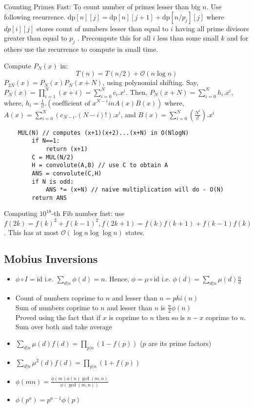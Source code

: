 Counting Primes Fast:  To count number of primes lesser than big $n$. Use following recurrence.
$\text{dp}[n][j] =\text{dp}[n][j + 1] + \text{dp}[n/p_j][j]$ where $dp[i][j]$ stores count of numbers lesser than equal to $i$
having all prime divisors greater than equal to $p_j$ . Precompute this for all $i$ less than some small $k$
and for others use the recurrence to compute in small time.

Compute $P_N(x)$ in:
\begin{equation}
  T(n)=T(n/2)+\mathcal{O}(n\log n)
\end{equation}
$P_{2N}(x) = P_{N}(x)P_{N}(x+N)$, using polynomial shifting.
Say, $P_N(x) = \prod \limits_{i=1}^N (x+i) = \sum_{i=0}^N c_i.x^i$.
Then, $P_N(x+N) = \sum_{i=0}^N h_i.x^i$, where, $h_i = \frac{1}{i!} . (\text{coefficient of } x^{N-i} in A(x)B(x))$ where, $A(x) = \sum \limits_{i=0}^{N} (c_{N-i}.(N-i)!) . x^i$, and $B(x) = \sum \limits_{i=0}^{N} \left( \frac {N^i}{i!} \right) . x^i$

\begin{verbatim}
    MUL(N) // computes (x+1)(x+2)...(x+N) in O(NlogN)
        if N==1:
            return (x+1)
        C = MUL(N/2)
        H = convolute(A,B) // use C to obtain A
        ANS = convolute(C,H)
        if N is odd:
            ANS *= (x+N) // naive multiplication will do - O(N)
        return ANS
\end{verbatim}

Computing $10^{18}$-th Fib number fast: use $f(2k) = f(k)^2 + f(k - 1)^2, f(2k + 1) = f(k)f(k + 1) + f(k - 1)f(k)$. This has at most $\mathcal{O}(\log n\log\log n)$ states.


\subsection{Mobius Inversions}

\begin{itemize}
  \item $\phi \circ I = \text{id}$ i.e. $\sum_{d|n} \phi(d)=n$. Hence, $\phi = \mu \circ \text{id}$ i.e. $\phi(d)=\sum_{d|n} \mu(d) \frac{n}{d}$
  \item Count of numbers coprime to $n$ and lesser than $n = phi(n)$ \\
        Sum of numbers coprime to $n$ and lesser than $n$  is $\frac{n}{2}\phi(n)$ \\
        Proved using the fact that if $x$ is coprime to $n$ then so is $n-x$ coprime to $n$. Sum over both and take average
  \item $\sum_{d|n} \mu(d)f(d)=\prod_{p|n} (1 - f(p))$ ($p$ are its prime factors)
  \item $\sum_{d|n} \mu^2(d)f(d)=\prod_{p|n} (1 + f(p))$
  \item $\phi(mn) = \frac{\phi(m)\phi(n)\gcd(m,n)}{\phi(\gcd(m,n))}$
  \item $\phi(p^a) = p^{a-1}\phi{(p)}$
\end{itemize}

